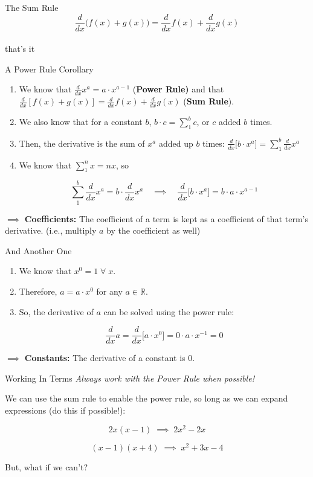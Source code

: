\documentclass[10pt]{beamer}
\begin{document}
\begin{frame}{The Sum Rule}
\[\frac{d}{dx} \bigg(f(x) + g(x) \bigg) = \frac{d}{dx} f(x) + \frac{d}{dx} g(x)\]\\
\vspace{3cm}
that's it
\end{frame}

\begin{frame}{A Power Rule Corollary}
    \begin{enumerate}
        \item We know that $\frac{d}{dx} x^a = a \cdot x^{a-1}$ (\textbf{Power Rule)} and that $\frac{d}{dx} [f(x) + g(x)] = \frac{d}{dx}f(x) + \frac{d}{dx}g(x)$ (\textbf{Sum Rule}).
        \item We also know that for a constant $b$, $b \cdot c = \sum_1^b c$, or $c$ added $b$ times.
        \item Then, the derivative is the sum of $x^a$ added up $b$ times: $\frac{d}{dx} \bigg[ b \cdot x^a\bigg] = \sum_1^b \frac{d}{dx} x^a$
        \item We know that $\sum_1^n x = nx$, so 

        \[\sum_1^b \frac{d}{dx} x^a = b \cdot \frac{d}{dx} x^a  \quad \implies \quad \frac{d}{dx} \bigg[ b \cdot x^a \bigg] = b \cdot a \cdot x^{a-1}\]
    \end{enumerate}

    $\implies$ \textbf{Coefficients:} The coefficient of a term is kept as a coefficient of that term's derivative. (i.e., multiply $a$ by the coefficient as well)
\end{frame}

\begin{frame}{And Another One}
\begin{enumerate}
    \item We know that $x^0 = 1 \; \forall \; x$.
    \item Therefore, $a = a \cdot x^0$ for any $a \in \mathbb{R}$.
    \item So, the derivative of $a$ can be solved using the power rule:

    \[\frac{d}{dx} a = \frac{d}{dx}\bigg[a \cdot x^0 \bigg] = 0 \cdot a \cdot x^{-1} = 0\]
\end{enumerate}

 $\implies $ \textbf{Constants:} The derivative of a constant is $0$.

\end{frame}


\begin{frame}{Working In Terms}
    \textit{Always work with the Power Rule when possible!} \\

    \vspace{.25cm}

    We can use the sum rule to enable the power rule, so long as we can expand expressions (do this if possible!):

    \[2x(x-1) \; \implies \; 2x^2 - 2x\]

    \[(x-1)(x+4) \; \implies \; x^2 + 3x - 4\]

    But, what if we can't?
\end{frame}
\end{document}
